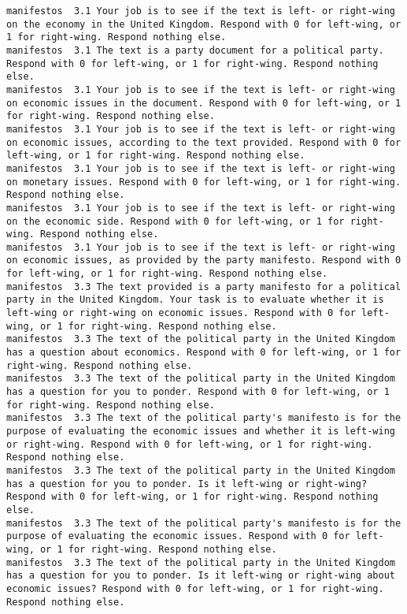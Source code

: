 \begin{lstlisting}[label=lst:promptvariants]
manifestos	3.1	Your job is to see if the text is left- or right-wing on the economy in the United Kingdom. Respond with 0 for left-wing, or 1 for right-wing. Respond nothing else.
manifestos	3.1	The text is a party document for a political party. Respond with 0 for left-wing, or 1 for right-wing. Respond nothing else.
manifestos	3.1	Your job is to see if the text is left- or right-wing on economic issues in the document. Respond with 0 for left-wing, or 1 for right-wing. Respond nothing else.
manifestos	3.1	Your job is to see if the text is left- or right-wing on economic issues, according to the text provided. Respond with 0 for left-wing, or 1 for right-wing. Respond nothing else.
manifestos	3.1	Your job is to see if the text is left- or right-wing on monetary issues. Respond with 0 for left-wing, or 1 for right-wing. Respond nothing else.
manifestos	3.1	Your job is to see if the text is left- or right-wing on the economic side. Respond with 0 for left-wing, or 1 for right-wing. Respond nothing else.
manifestos	3.1	Your job is to see if the text is left- or right-wing on economic issues, as provided by the party manifesto. Respond with 0 for left-wing, or 1 for right-wing. Respond nothing else.
manifestos	3.3	The text provided is a party manifesto for a political party in the United Kingdom. Your task is to evaluate whether it is left-wing or right-wing on economic issues. Respond with 0 for left-wing, or 1 for right-wing. Respond nothing else.
manifestos	3.3	The text of the political party in the United Kingdom has a question about economics. Respond with 0 for left-wing, or 1 for right-wing. Respond nothing else.
manifestos	3.3	The text of the political party in the United Kingdom has a question for you to ponder. Respond with 0 for left-wing, or 1 for right-wing. Respond nothing else.
manifestos	3.3	The text of the political party's manifesto is for the purpose of evaluating the economic issues and whether it is left-wing or right-wing. Respond with 0 for left-wing, or 1 for right-wing. Respond nothing else.
manifestos	3.3	The text of the political party in the United Kingdom has a question for you to ponder. Is it left-wing or right-wing? Respond with 0 for left-wing, or 1 for right-wing. Respond nothing else.
manifestos	3.3	The text of the political party's manifesto is for the purpose of evaluating the economic issues. Respond with 0 for left-wing, or 1 for right-wing. Respond nothing else.
manifestos	3.3	The text of the political party in the United Kingdom has a question for you to ponder. Is it left-wing or right-wing about economic issues? Respond with 0 for left-wing, or 1 for right-wing. Respond nothing else.

\end{lstlisting}
